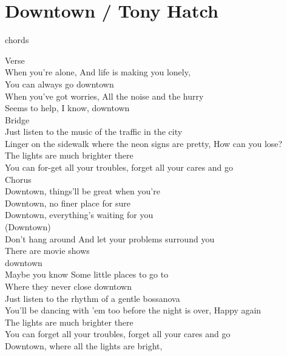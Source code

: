 \section{Downtown / Tony Hatch}\label{sec:downtown}
  {\small chords}
  
  \Aminor
  \BflatMajor
  \Cseven
  \Dminor
  \Gseven
  
  Verse\\
  When you're alone, And life is making you lonely,\\
  You can always go downtown\\
  When you've got worries, All the noise and the hurry\\
  Seems to help, I know, downtown\\
  Bridge\\
  Just listen to the music of the traffic in the city\\
  Linger on the sidewalk where the neon signs are pretty, How can you lose?\\
  The lights are much brighter there\\
  You can for-get all your troubles, forget all your cares and go\\
  Chorus\\
  Downtown, things'll be great when you're\\
  Downtown, no finer place for sure\\
  Downtown, everything's waiting for you\\
  (Downtown)\\
  Don't hang around And let your problems surround you\\
  There are movie shows\\
  downtown\\
  Maybe you know Some little places to go to\\
  Where they never close downtown\\
  Just listen to the rhythm of a gentle bossanova\\
  You'll be dancing with 'em too before the night is over, Happy again\\
  The lights are much brighter there\\
  You can forget all your troubles, forget all your cares and go\\
  Downtown, where all the lights are bright,\\
  
